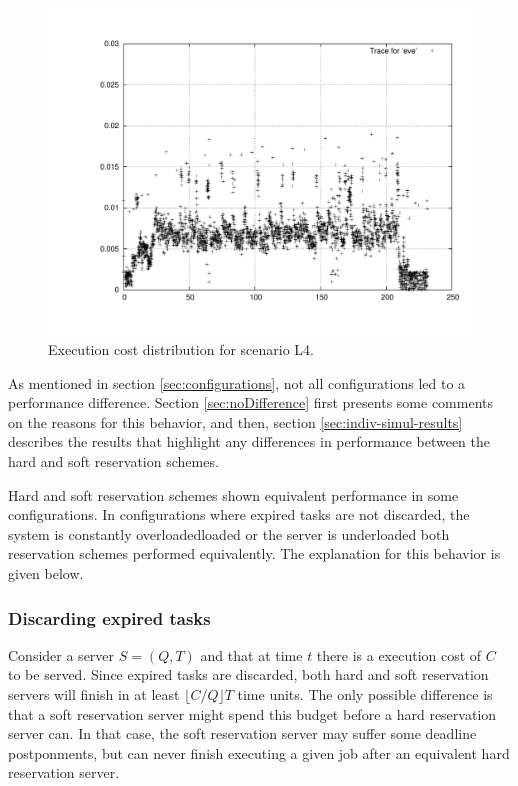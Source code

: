 \documentclass[times, 10pt,twocolumn]{article}
\begin{document}
\begin{figure}[h!t]
  \centering
  \includegraphics[scale=0.31]{trace-eve}
  \caption{Execution cost distribution for scenario L4.}
  \label{fig:plotl4}
\end{figure}

\label{sec:simulation-results}

As mentioned in section \ref{sec:configurations}, not all
configurations led to a performance difference. Section
\ref{sec:noDifference} first presents some comments on the reasons for
this behavior, and then, section \ref{sec:indiv-simul-results}
describes the results that highlight any differences in performance
between the hard and soft reservation schemes.

\label{sec:noDifference}

Hard and soft reservation schemes shown equivalent performance in some
configurations. In configurations where expired tasks are not
discarded, the system is constantly overloadedloaded or the server is
underloaded both reservation schemes performed equivalently. The
explanation for this behavior is given below.

\subsubsection{Discarding expired tasks}
\label{sec:disc-expir-tasks}

Consider a server $S = (Q,T)$ and that at time $t$ there is a
execution cost of $C$ to be served.  Since expired tasks are
discarded, both hard and soft reservation servers will finish in at
least $\lfloor C/Q \rfloor T$ time units.  The only possible
difference is that a soft reservation server might spend this budget
before a hard reservation server can. In that case, the soft
reservation server may suffer some deadline postponments, but can
never finish executing a given job after an equivalent hard
reservation server.
\end{document}
